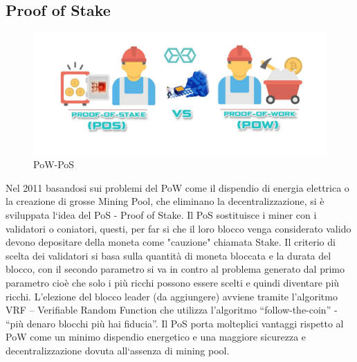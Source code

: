 \documentclass[11pt,a4paper,titlepage]{report}
\begin{document}
\subsection{Proof of Stake}
\begin{figure}[h]
	\includegraphics[width=\textwidth]{pow-pos}
	\centering
	\caption{PoW-PoS}
	\label{fig:pow-pos}
\end{figure}

Nel 2011 basandosi sui problemi del PoW come il dispendio di energia elettrica o la creazione di grosse Mining Pool, che eliminano la decentralizzazione, si è sviluppata l`idea del PoS - Proof of Stake. Il PoS sostituisce i miner con i validatori o coniatori, questi, per far si che il loro blocco venga considerato valido devono depositare della moneta come "cauzione" chiamata Stake.
Il criterio di scelta dei validatori si basa sulla quantità di moneta bloccata e la durata del blocco, con il secondo parametro si va in contro al problema generato dal primo parametro cioè che solo i più ricchi possono essere scelti e quindi diventare più ricchi.
L’elezione del blocco leader (da aggiungere) avviene tramite l’algoritmo VRF – Verifiable Random Function che utilizza l’algoritmo “follow-the-coin” - “più denaro blocchi più hai fiducia”. Il PoS porta molteplici vantaggi rispetto al PoW come un minimo dispendio energetico e una maggiore sicurezza e decentralizzazione dovuta all`assenza di mining pool.
\end{document}
